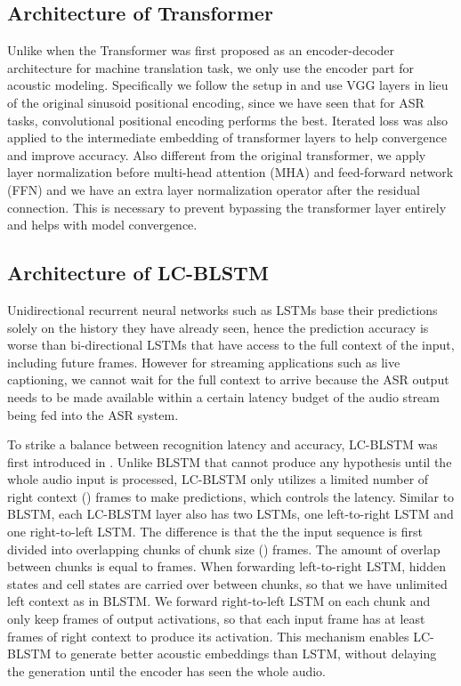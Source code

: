 \documentclass[a4paper]{article}
\begin{document}
\subsection{Architecture of Transformer}
\label{sec:transformer_arch}
Unlike when the Transformer\cite{vaswani2017attention} was first proposed as an encoder-decoder architecture for machine translation task, we only use the encoder part for acoustic modeling. Specifically we follow the setup in \cite{wang2019transformerbased} and use VGG layers\cite{abdel2014convolutional} in lieu of the original sinusoid positional encoding, since we have seen that for ASR tasks, convolutional positional encoding performs the best. Iterated loss\cite{Andros2019} was also applied to the intermediate embedding of transformer layers to help convergence and improve accuracy. Also different from the original transformer, we apply layer normalization \cite{lei2016layer} before multi-head attention (MHA) and feed-forward network (FFN) and we have an extra layer normalization operator after the residual connection. This is necessary to prevent bypassing the transformer layer entirely and helps with model convergence. 

\subsection{Architecture of LC-BLSTM}
\label{sec:lc_blstm_arch}

Unidirectional recurrent neural networks such as LSTMs base their predictions solely on the history they have already seen, hence the prediction accuracy is worse than bi-directional LSTMs that have access to the full context of the input, including future frames. However for streaming applications such as live captioning, we cannot wait for the full context to arrive because the ASR output needs to be made available within a certain latency budget of the audio stream being fed into the ASR system.

To strike a balance between recognition latency and accuracy, LC-BLSTM was first introduced in \cite{zhang2016highway}. Unlike BLSTM that cannot produce any hypothesis until the whole audio input is processed, LC-BLSTM only utilizes a limited number of right context () frames to make predictions, which controls the latency. Similar to BLSTM, each LC-BLSTM layer also has two LSTMs, one left-to-right LSTM and one right-to-left LSTM. The difference is that the the input sequence is first divided into overlapping chunks of chunk size () frames. The amount of overlap between chunks is equal to  frames. When forwarding left-to-right LSTM, hidden states and cell states are carried over between chunks, so that we have unlimited left context as in BLSTM. We forward right-to-left LSTM on each chunk and only keep  frames of output activations, so that each input frame has at least  frames of right context to produce its activation. This mechanism enables LC-BLSTM to generate better acoustic embeddings than LSTM, without delaying the generation until the encoder has seen the whole audio.
\end{document}
